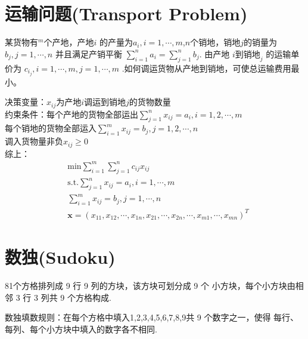 \documentclass[10t, a4paper, oneside]{ctexbook}
\begin{document}
\section{运输问题(Transport Problem)}
某货物有$^{m}$个产地，产地$i$ 的产量为$a_i,i=1,\cdots,m$,$n$个销地，销地$j$的销量为 $b_j,j=1,\cdots,n$
并且满足产销平衡 $\sum_{i=1}^{n}a_{i}=\sum_{j= 1}^{n}b_j$. 
由产地 $i\text{到销地}_j$ 的运输单价为 $c_{i_j},i=1,\cdots,m,j=1, \cdots, m$ .如何调运货物从产地到销地，可使总运输费用最小。

决策变量：$x_{ij}$为产地$i$调运到销地$j$的货物数量\\
约束条件：每个产地的货物全部运出$\sum_{j = 1}^nx_{ij} = a_i, i = 1,2,\cdots, m$\\
每个销地的货物全部运入$\sum_{i = 1}^m x_{ij} = b_j, j = 1,2,\cdots,n$\\
调入货物量非负$x_{ij} \ge 0$\\
综上：
$$\begin{aligned}
    &\text{min} \sum_{i=1}^{m}\sum_{j=1}^{n}c_{ij}x_{ij}  \\
    &\text{s.t.} \sum_{j=1}^{n}x_{ij}=a_{i},i=1,\cdots,m  \\
    &\sum_{i=1}^{m}x_{ij}=b_{j},j=1,\cdots,n \\
    &\mathbf{x}=\left(x_{11},x_{12},\cdots,x_{1n},x_{21},\cdots,x_{2n},\cdots,x_{m1},\cdots,x_{mn}\right)^{T}
    \end{aligned}$$
\section{数独(Sudoku)}
81个方格排列成 9 行 9 列的方块，该方块可划分成 9 个
小方块，每个小方块由相邻 3 行 3 列共 9 个方格构成.

数独填数规则：在每个方格中填入1,2,3,4,5,6,7,8,9共 9 个数字之一，使得
每行、每列、每个小方块中填入的数字各不相同.
\end{document}
